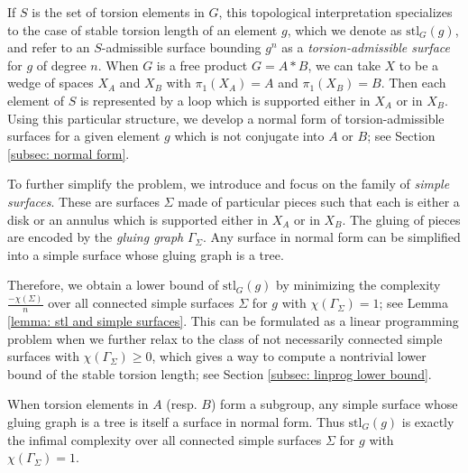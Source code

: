 \documentclass{amsart}
\theoremstyle{definition}
\numberwithin{equation}{section}
\theoremstyle{theorem}
\theoremstyle{remark}
\def\stl{\mathrm{stl}}
\begin{document}
	If $S$ is the set of torsion elements in $G$, this topological interpretation specializes to the case of stable torsion length of an element $g$, which we denote as $\stl_G(g)$,
	and refer to an $S$-admissible surface bounding $g^n$ as a \emph{torsion-admissible surface} for $g$ of degree $n$. 
	When $G$ is a free product $G=A*B$, we can take $X$ to be a wedge of spaces $X_A$ and $X_B$ with $\pi_1(X_A)=A$ and $\pi_1(X_B)=B$. 
	Then each element of $S$ is represented by a loop which is supported either in $X_A$ or in $X_B$. 
	Using this particular structure, we develop a normal form of torsion-admissible surfaces for a given element $g$ which is not conjugate into $A$ or $B$; see Section \ref{subsec: normal form}.
	
	To further simplify the problem, we introduce and focus on the family of \emph{simple surfaces}. These are surfaces $\Sigma$ made of particular pieces such that each is either a disk or an annulus which is supported either in $X_A$ or in $X_B$. The gluing of pieces are encoded by the \emph{gluing graph} $\Gamma_\Sigma$.
	Any surface in normal form can be simplified into a simple surface whose gluing graph is a tree. %
	
	
	Therefore, we obtain a lower bound of $\stl_G(g)$ by minimizing the complexity $\frac{-\chi(\Sigma)}{n}$ over all connected simple surfaces $\Sigma$ for $g$ with $\chi(\Gamma_\Sigma)=1$; see Lemma \ref{lemma: stl and simple surfaces}. This can be formulated as a linear programming problem when we further relax to the class of not necessarily connected simple surfaces with $\chi(\Gamma_\Sigma)\ge0$, which gives a way to compute a nontrivial
	lower bound of the stable torsion length; see Section \ref{subsec: linprog lower bound}.
	
	When torsion elements in $A$ (resp. $B$) form a subgroup, any simple surface whose gluing graph is a tree is itself a surface in normal form.
	Thus $\stl_G(g)$ is exactly the infimal complexity over all connected simple surfaces $\Sigma$ for $g$ with $\chi(\Gamma_\Sigma)=1$.
	
\end{document}
